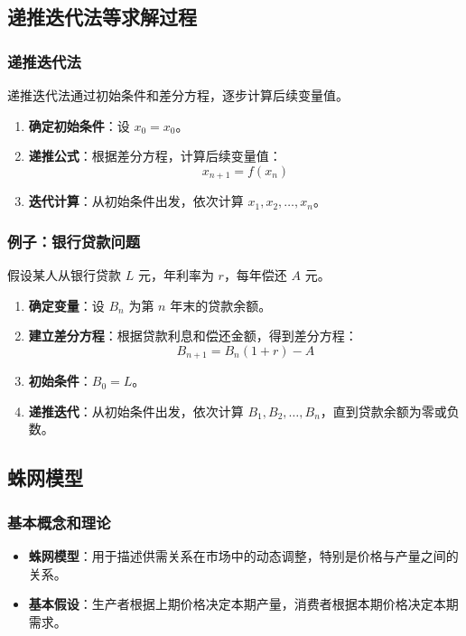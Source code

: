 \documentclass[UTF8]{ctexart}
\begin{document}
\subsection {递推迭代法等求解过程}
\subsubsection {递推迭代法}
递推迭代法通过初始条件和差分方程，逐步计算后续变量值。
\begin{enumerate}
    \item \textbf{确定初始条件}：设 \( x_0 = x_0 \)。
    \item \textbf{递推公式}：根据差分方程，计算后续变量值：
    \[
    x_{n+1} = f(x_n)
    \]
    \item \textbf{迭代计算}：从初始条件出发，依次计算 \( x_1, x_2, \ldots, x_n \)。
\end{enumerate}

\subsubsection {例子：银行贷款问题}
假设某人从银行贷款 \( L \) 元，年利率为 \( r \)，每年偿还 \( A \) 元。
\begin{enumerate}
    \item \textbf{确定变量}：设 \( B_n \) 为第 \( n \) 年末的贷款余额。
    \item \textbf{建立差分方程}：根据贷款利息和偿还金额，得到差分方程：
    \[
    B_{n+1} = B_n (1 + r) - A
    \]
    \item \textbf{初始条件}：\( B_0 = L \)。
    \item \textbf{递推迭代}：从初始条件出发，依次计算 \( B_1, B_2, \ldots, B_n \)，直到贷款余额为零或负数。
\end{enumerate}

\subsection {蛛网模型}
\subsubsection {基本概念和理论}
\begin{itemize}
    \item \textbf{蛛网模型}：用于描述供需关系在市场中的动态调整，特别是价格与产量之间的关系。
    \item \textbf{基本假设}：生产者根据上期价格决定本期产量，消费者根据本期价格决定本期需求。
\end{itemize}
\end{document}
